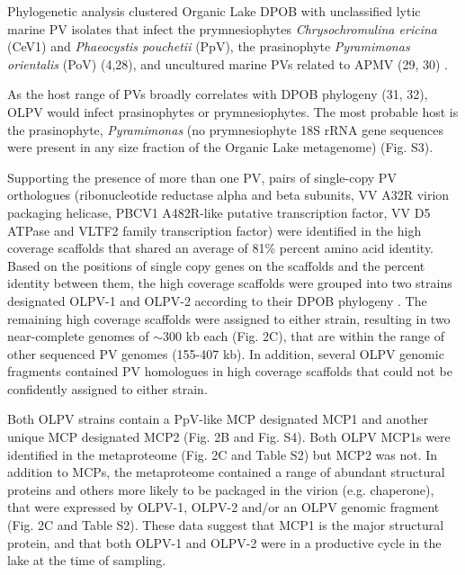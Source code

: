 Phylogenetic analysis clustered Organic Lake \ac{DPOB} with unclassified lytic marine \ac{PV} isolates that infect the prymnesiophytes \emph{Chrysochromulina ericina} (CeV1) and \emph{Phaeocystis pouchetii} (PpV),
 the prasinophyte \emph{Pyramimonas orientalis} (PoV) (4,28), and uncultured marine \acp{PV} related to \ac{APMV} (29, 30) . 

As the host range of \acp{PV} broadly correlates with \ac{DPOB} phylogeny (31, 32), \ac{OLPV} would infect prasinophytes or prymnesiophytes. 
The most probable host is the prasinophyte, \emph{Pyramimonas} (no prymnesiophyte 18S \ac{rRNA} gene sequences were present in any size fraction of the Organic Lake metagenome) (Fig. S3).

Supporting the presence of more than one \ac{PV}, pairs of single-copy \ac{PV} orthologues 
(ribonucleotide reductase alpha and beta subunits, VV A32R virion packaging helicase, \textsc{PBCV1} A482R-like putative transcription factor, VV D5 ATPase and VLTF2 family transcription factor) 
were identified in the high coverage scaffolds that shared an average of 81\% percent amino acid identity.
 Based on the positions of single copy genes on the scaffolds and the percent identity between them, the high coverage scaffolds were grouped into two strains designated \ac{OLPV}-1 and \ac{OLPV}-2 according to their \ac{DPOB} phylogeny .
 The remaining high coverage scaffolds were assigned to either strain, resulting in two near-complete genomes of $\sim$300 kb each (Fig. 2C), 
that are within the range of other sequenced \ac{PV} genomes (155-407 kb). 
In addition, several \ac{OLPV} genomic fragments contained \ac{PV} homologues in high coverage scaffolds that could not be confidently assigned to either strain. 

Both \ac{OLPV} strains contain a PpV-like \ac{MCP} designated \ac{MCP}1 and another unique \ac{MCP} designated \ac{MCP}2 (Fig. 2B and Fig. S4). 
Both \ac{OLPV} \ac{MCP}1s were identified in the metaproteome (Fig. 2C and Table S2) but \ac{MCP}2 was not. 
In addition to \acp{MCP}, the metaproteome contained a range of abundant structural proteins and others more likely to be packaged in the virion (e.g. chaperone), that were expressed by \ac{OLPV}-1, \ac{OLPV}-2 and/or an \ac{OLPV} genomic fragment (Fig. 2C and Table S2). 
These data suggest that \ac{MCP}1 is the major structural protein, and that both \ac{OLPV}-1 and \ac{OLPV}-2 were in a productive cycle in the lake at the time of sampling. 

